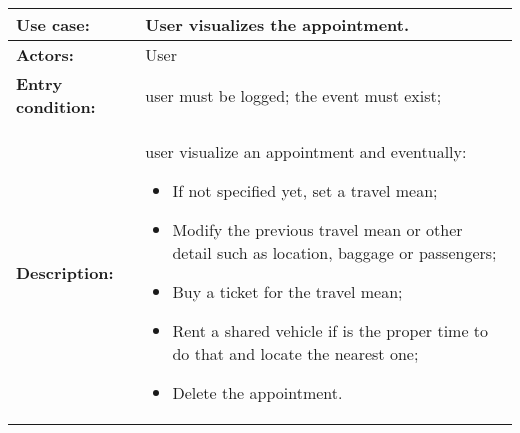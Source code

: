 		\begin{table}[h!]
		\begin{tabu} to \textwidth {| X[\fcWidth,r,p] | X[1-\fcWidth,l,p] |}
			\hline\textbf{Use case:} & User visualizes the appointment.
			\\
			\hline\textbf{Actors:} & User
			\\
			\hline\textbf{Entry condition:} & user must be logged;\newline
			the event must exist;
			
			\\
			\hline\textbf{Description:} & user visualize an appointment and eventually:
				\begin{itemize}
			\item If not specified yet, set a travel mean;
			\item 	Modify the previous travel mean or other detail such as location, baggage or passengers;
			\item Buy a ticket for the travel mean;
			\item 	Rent a shared vehicle if is the proper time to do that and locate the nearest one;
			\item 	Delete the appointment. 
		\end{itemize}
		\end{tabu}
	\end{table}

